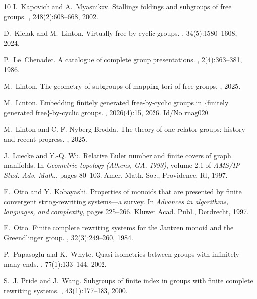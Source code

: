 \documentclass[12pt, a4paper]{amsart}
\theoremstyle{definition}
\begin{document}
\begin{thebibliography}{10}
I.~Kapovich and A.~Myasnikov.
\newblock Stallings foldings and subgroups of free groups.
, 248(2):608--668, 2002.

D.~Kielak and M.~Linton.
\newblock Virtually free-by-cyclic groups.
, 34(5):1580--1608, 2024.

P.~Le~Chenadec.
\newblock A catalogue of complete group presentations.
, 2(4):363--381, 1986.

M.~Linton.
\newblock The geometry of subgroups of mapping tori of free groups.
, 2025.

M.~Linton.
\newblock Embedding finitely generated free-by-cyclic groups in
  {{\(\{\)}}finitely generated free{{\(\}\)}}-by-cyclic groups.
, 2026(4):15, 2026.
\newblock Id/No rnag020.

M.~Linton and C.-F. Nyberg-Brodda.
\newblock The theory of one-relator groups: history and recent progress.
, 2025.

J.~Luecke and Y.-Q. Wu.
\newblock Relative {E}uler number and finite covers of graph manifolds.
\newblock In {\em Geometric topology ({A}thens, {GA}, 1993)}, volume 2.1 of
  {\em AMS/IP Stud. Adv. Math.}, pages 80--103. Amer. Math. Soc., Providence,
  RI, 1997.

F.~Otto and Y.~Kobayashi.
\newblock Properties of monoids that are presented by finite convergent
  string-rewriting systems---a survey.
\newblock In {\em Advances in algorithms, languages, and complexity}, pages
  225--266. Kluwer Acad. Publ., Dordrecht, 1997.

F.~Otto.
\newblock Finite complete rewriting systems for the {J}antzen monoid and the
  {G}reendlinger group.
, 32(3):249--260, 1984.

P.~Papasoglu and K.~Whyte.
\newblock Quasi-isometries between groups with infinitely many ends.
, 77(1):133--144, 2002.

S.~J. Pride and J.~Wang.
\newblock Subgroups of finite index in groups with finite complete rewriting
  systems.
, 43(1):177–183, 2000.


\end{thebibliography}
\end{document}
